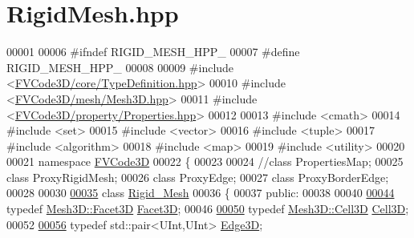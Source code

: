 \hypertarget{RigidMesh_8hpp_source}{}\section{Rigid\+Mesh.\+hpp}
\label{RigidMesh_8hpp_source}

\begin{DoxyCode}
00001 
00006 \textcolor{preprocessor}{#ifndef RIGID\_MESH\_HPP\_}
00007 \textcolor{preprocessor}{#define RIGID\_MESH\_HPP\_}
00008 
00009 \textcolor{preprocessor}{#include <\hyperlink{TypeDefinition_8hpp}{FVCode3D/core/TypeDefinition.hpp}>}
00010 \textcolor{preprocessor}{#include <\hyperlink{Mesh3D_8hpp}{FVCode3D/mesh/Mesh3D.hpp}>}
00011 \textcolor{preprocessor}{#include <\hyperlink{Properties_8hpp}{FVCode3D/property/Properties.hpp}>}
00012 
00013 \textcolor{preprocessor}{#include <cmath>}
00014 \textcolor{preprocessor}{#include <set>}
00015 \textcolor{preprocessor}{#include <vector>}
00016 \textcolor{preprocessor}{#include <tuple>}
00017 \textcolor{preprocessor}{#include <algorithm>}
00018 \textcolor{preprocessor}{#include <map>}
00019 \textcolor{preprocessor}{#include <utility>}
00020 
00021 \textcolor{keyword}{namespace }\hyperlink{namespaceFVCode3D}{FVCode3D}
00022 \{
00023 
00024 \textcolor{comment}{//class PropertiesMap;}
00025 \textcolor{keyword}{class }ProxyRigidMesh;
00026 \textcolor{keyword}{class }ProxyEdge;
00027 \textcolor{keyword}{class }ProxyBorderEdge;
00028 
00030 
\hypertarget{RigidMesh_8hpp_source.tex_l00035}{}\hyperlink{classFVCode3D_1_1Rigid__Mesh}{00035} \textcolor{keyword}{class }\hyperlink{classFVCode3D_1_1Rigid__Mesh}{Rigid\_Mesh}
00036 \{
00037 \textcolor{keyword}{public}:
00038 
00040 
\hypertarget{RigidMesh_8hpp_source.tex_l00044}{}\hyperlink{classFVCode3D_1_1Rigid__Mesh_aafcadb25b9a244bc7beff08659a0e3cb}{00044}     \textcolor{keyword}{typedef} \hyperlink{classFVCode3D_1_1Mesh3D_1_1Facet3D}{Mesh3D::Facet3D} \hyperlink{classFVCode3D_1_1Rigid__Mesh_aafcadb25b9a244bc7beff08659a0e3cb}{Facet3D};
00046 
\hypertarget{RigidMesh_8hpp_source.tex_l00050}{}\hyperlink{classFVCode3D_1_1Rigid__Mesh_a0895aca7f04d8fc41dd933640735bbcf}{00050}     \textcolor{keyword}{typedef} \hyperlink{classFVCode3D_1_1Mesh3D_1_1Cell3D}{Mesh3D::Cell3D} \hyperlink{classFVCode3D_1_1Rigid__Mesh_a0895aca7f04d8fc41dd933640735bbcf}{Cell3D};
00052 
\hypertarget{RigidMesh_8hpp_source.tex_l00056}{}\hyperlink{classFVCode3D_1_1Rigid__Mesh_a396039ac2943822c4652967ce1849c9f}{00056}     \textcolor{keyword}{typedef} std::pair<UInt,UInt> \hyperlink{classFVCode3D_1_1Rigid__Mesh_a396039ac2943822c4652967ce1849c9f}{Edge3D};

\end{DoxyCode}
